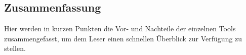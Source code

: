 \subsection{Zusammenfassung}\label{zusammenfassung}

Hier werden in kurzen Punkten die Vor- und Nachteile der einzelnen Tools zusammengefasst,
um dem Leser einen schnellen Überblick zur Verfügung zu stellen.